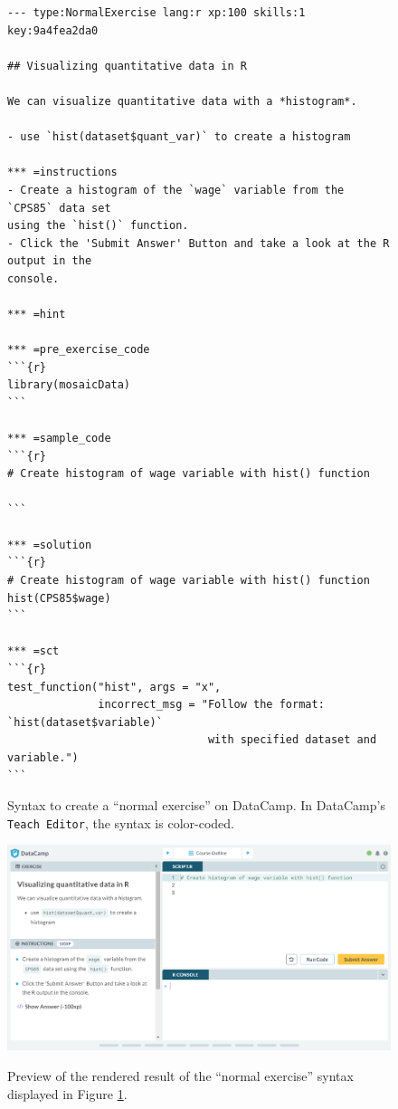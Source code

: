 \documentclass{tise_style_doi}
\begin{document}
\begin{figure}
\caption{Syntax to create a ``normal exercise'' on DataCamp.  In DataCamp's
\texttt{Teach Editor}, the syntax is color-coded.}
\begin{Verbatim}[frame=single]
--- type:NormalExercise lang:r xp:100 skills:1 key:9a4fea2da0

## Visualizing quantitative data in R

We can visualize quantitative data with a *histogram*.

- use `hist(dataset$quant_var)` to create a histogram

*** =instructions
- Create a histogram of the `wage` variable from the `CPS85` data set 
using the `hist()` function.
- Click the 'Submit Answer' Button and take a look at the R output in the 
console.

*** =hint

*** =pre_exercise_code
```{r}
library(mosaicData)
```

*** =sample_code
```{r}
# Create histogram of wage variable with hist() function

```

*** =solution
```{r}
# Create histogram of wage variable with hist() function
hist(CPS85$wage)
```

*** =sct
```{r}
test_function("hist", args = "x", 
              incorrect_msg = "Follow the format: `hist(dataset$variable)` 
                               with specified dataset and variable.")
```

\end{Verbatim}
\label{fig:code1}
\end{figure}

\begin{figure}[h] 
\caption{Preview of the rendered result of the ``normal exercise'' syntax displayed 
in Figure \ref{fig:code1}.}
\includegraphics[width = 1.0\textwidth] {code1preview.png}
\label{fig:preview}
\end{figure}
\end{document}
